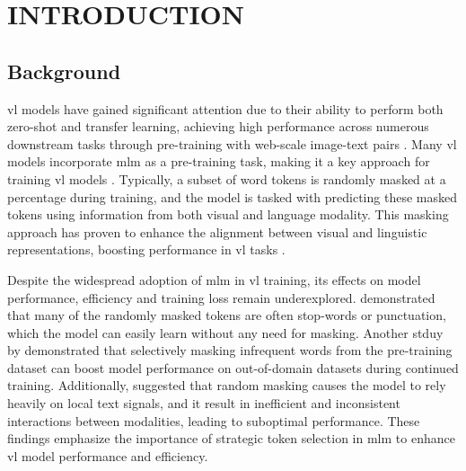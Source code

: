 \setlength{\parindent}{0in}
\setlength{\parskip}{1.5mm}
\setlength{\baselineskip}{1.6em}

\chapter{INTRODUCTION}
\section{Background}
\acrfull{vl} models have gained significant attention due to their ability to perform both zero-shot and transfer learning, achieving high performance across numerous downstream tasks through pre-training with web-scale image-text pairs \cite{s-clip, medclip, vl-review}.
Many \acrshort{vl} models incorporate \acrfull{mlm} as a pre-training task, making it a key approach for training \acrshort{vl} models \cite{albef, mplug, uniter, beit-3, lxmert}.
Typically, a subset of word tokens is randomly masked at a percentage during training, and the model is tasked with predicting these masked tokens using information from both visual and language modality.
This masking approach has proven to enhance the alignment between visual and linguistic representations, boosting performance in \acrshort{vl} tasks \cite{lxmert}.

Despite the widespread adoption of \acrshort{mlm} in \acrshort{vl} training, its effects on model performance, efficiency and training loss remain underexplored.
 demonstrated that many of the randomly masked tokens are often stop-words or punctuation, which the model can easily learn without any need for masking.
Another stduy by  demonstrated that selectively masking infrequent words from the pre-training dataset can boost model performance on out-of-domain datasets during continued training.
Additionally,  suggested that random masking causes the model to rely heavily on local text signals, and it result in inefficient and inconsistent interactions between modalities, leading to suboptimal performance.
These findings emphasize the importance of strategic token selection in \acrshort{mlm} to enhance \acrshort{vl} model performance and efficiency.

